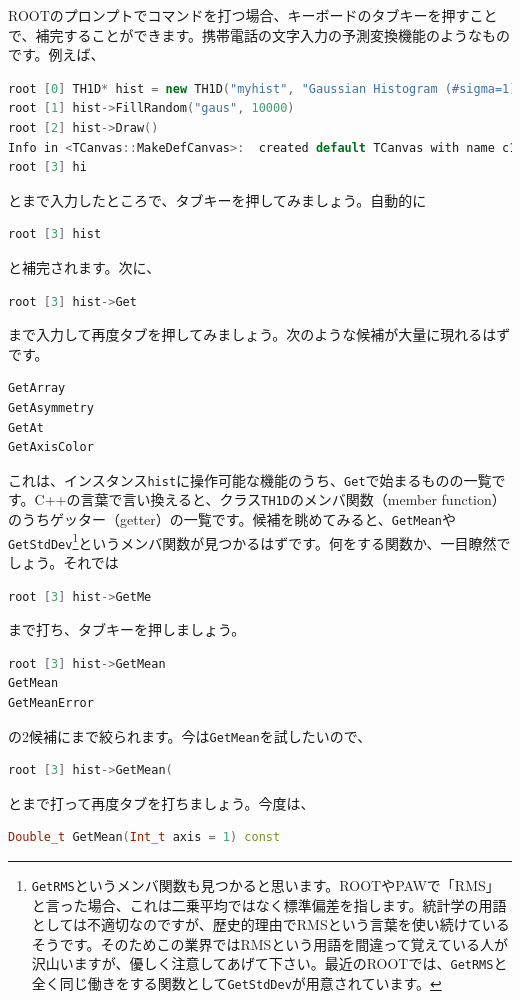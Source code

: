 ROOTのプロンプトでコマンドを打つ場合、キーボードのタブキーを押すことで、補完することができます。携帯電話の文字入力の予測変換機能のようなものです。例えば、
\begin{lstlisting}[language=c++]
root [0] TH1D* hist = new TH1D("myhist", "Gaussian Histogram (#sigma=1)", 50, -5, 5)
root [1] hist->FillRandom("gaus", 10000)
root [2] hist->Draw()
Info in <TCanvas::MakeDefCanvas>:  created default TCanvas with name c1
root [3] hi
\end{lstlisting}
とまで入力したところで、タブキーを押してみましょう。自動的に
\begin{lstlisting}[language=c++]
root [3] hist
\end{lstlisting}
と補完されます。次に、
\begin{lstlisting}[language=c++]
root [3] hist->Get
\end{lstlisting}
まで入力して再度タブを押してみましょう。次のような候補が大量に現れるはずです。
\begin{lstlisting}[language=c++]
GetArray
GetAsymmetry
GetAt
GetAxisColor
\end{lstlisting}
これは、インスタンス\texttt{hist}に操作可能な機能のうち、\texttt{Get}で始まるものの一覧です。C++の言葉で言い換えると、クラス\texttt{TH1D}のメンバ関数（member function）のうちゲッター（getter）の一覧です。候補を眺めてみると、\texttt{GetMean}や\texttt{GetStdDev}\footnote{\texttt{GetRMS}というメンバ関数も見つかると思います。ROOTやPAWで「RMS」と言った場合、これは二乗平均ではなく標準偏差を指します。統計学の用語としては不適切なのですが、歴史的理由でRMSという言葉を使い続けているそうです。そのためこの業界ではRMSという用語を間違って覚えている人が沢山いますが、優しく注意してあげて下さい。最近のROOTでは、\texttt{GetRMS}と全く同じ働きをする関数として\texttt{GetStdDev}が用意されています。}というメンバ関数が見つかるはずです。何をする関数か、一目瞭然でしょう。それでは
\begin{lstlisting}[language=c++]
root [3] hist->GetMe
\end{lstlisting}
まで打ち、タブキーを押しましょう。
\begin{lstlisting}[language=c++]
root [3] hist->GetMean
GetMean
GetMeanError
\end{lstlisting}
の2候補にまで絞られます。今は\texttt{GetMean}を試したいので、
\begin{lstlisting}[language=c++]
root [3] hist->GetMean(
\end{lstlisting}
とまで打って再度タブを打ちましょう。今度は、
\begin{lstlisting}[language=c++]
Double_t GetMean(Int_t axis = 1) const
\end{lstlisting}
